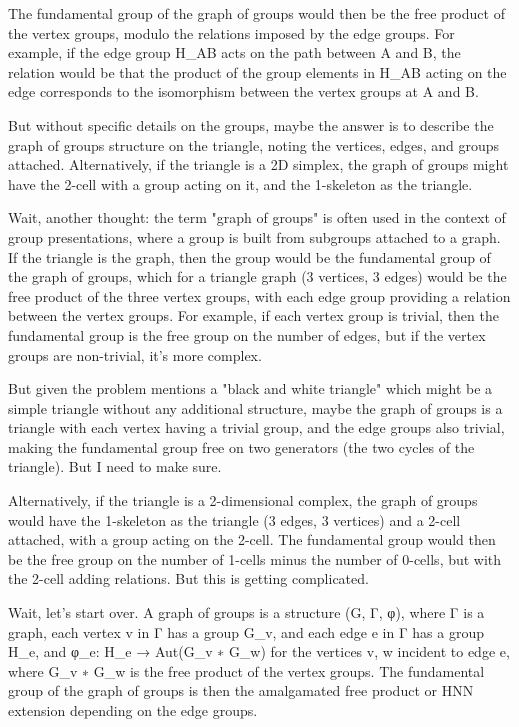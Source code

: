 The fundamental group of the graph of groups would then be the free product of the vertex groups, modulo the relations imposed by the edge groups. For example, if the edge group H_AB acts on the path between A and B, the relation would be that the product of the group elements in H_AB acting on the edge corresponds to the isomorphism between the vertex groups at A and B.

But without specific details on the groups, maybe the answer is to describe the graph of groups structure on the triangle, noting the vertices, edges, and groups attached. Alternatively, if the triangle is a 2D simplex, the graph of groups might have the 2-cell with a group acting on it, and the 1-skeleton as the triangle.

Wait, another thought: the term "graph of groups" is often used in the context of group presentations, where a group is built from subgroups attached to a graph. If the triangle is the graph, then the group would be the fundamental group of the graph of groups, which for a triangle graph (3 vertices, 3 edges) would be the free product of the three vertex groups, with each edge group providing a relation between the vertex groups. For example, if each vertex group is trivial, then the fundamental group is the free group on the number of edges, but if the vertex groups are non-trivial, it's more complex.

But given the problem mentions a "black and white triangle" which might be a simple triangle without any additional structure, maybe the graph of groups is a triangle with each vertex having a trivial group, and the edge groups also trivial, making the fundamental group free on two generators (the two cycles of the triangle). But I need to make sure.

Alternatively, if the triangle is a 2-dimensional complex, the graph of groups would have the 1-skeleton as the triangle (3 edges, 3 vertices) and a 2-cell attached, with a group acting on the 2-cell. The fundamental group would then be the free group on the number of 1-cells minus the number of 0-cells, but with the 2-cell adding relations. But this is getting complicated.

Wait, let's start over. A graph of groups is a structure (G, Γ, φ), where Γ is a graph, each vertex v in Γ has a group G_v, and each edge e in Γ has a group H_e, and φ_e: H_e → Aut(G_v ∗ G_w) for the vertices v, w incident to edge e, where G_v ∗ G_w is the free product of the vertex groups. The fundamental group of the graph of groups is then the amalgamated free product or HNN extension depending on the edge groups.

